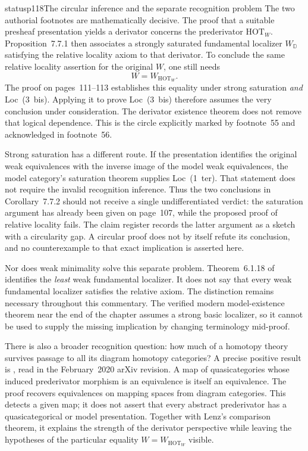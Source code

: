 \begin{dcomment}{status}{p118}{The circular inference and the separate recognition problem}
The two authorial footnotes are mathematically decisive. The proof that a suitable presheaf presentation yields a derivator concerns the prederivator $\mathrm{HOT}_W$. Proposition~7.7.1 then associates a strongly saturated fundamental localizer $W_{\mathbb D}$ satisfying the relative locality axiom to that derivator. To conclude the same relative locality assertion for the original $W$, one still needs
\[
 W=W_{\mathrm{HOT}_W}.
\]
The proof on pages~111--113 establishes this equality under strong saturation \emph{and} Loc~(3~bis). Applying it to prove Loc~(3~bis) therefore assumes the very conclusion under consideration. The derivator existence theorem does not remove that logical dependence. This is the circle explicitly marked by footnote~55 and acknowledged in footnote~56.

Strong saturation has a different route. If the presentation identifies the original weak equivalences with the inverse image of the model weak equivalences, the model category's saturation theorem supplies Loc~(1~ter). That statement does not require the invalid recognition inference. Thus the two conclusions in Corollary~7.7.2 should not receive a single undifferentiated verdict: the saturation argument has already been given on page~107, while the proposed proof of relative locality fails. The claim register records the latter argument as a sketch with a circularity gap. A circular proof does not by itself refute its conclusion, and no counterexample to that exact implication is asserted here.

Nor does weak minimality solve this separate problem. Theorem~6.1.18 of \citet{Cisinski2006} identifies the \emph{least} weak fundamental localizer. It does not say that every weak fundamental localizer satisfies the relative axiom. The distinction remains necessary throughout this commentary. The verified modern model-existence theorem near the end of the chapter assumes a strong basic localizer, so it cannot be used to supply the missing implication by changing terminology mid-proof.

There is also a broader recognition question: how much of a homotopy theory survives passage to all its diagram homotopy categories? A precise positive result is \citet[Theorem~37]{Arlin2020}, read in the February~2020 arXiv revision. A map of quasicategories whose induced prederivator morphism is an equivalence is itself an equivalence. The proof recovers equivalences on mapping spaces from diagram categories. This detects a given map; it does not assert that every abstract prederivator has a quasicategorical or model presentation. Together with Lenz's comparison theorem, it explains the strength of the derivator perspective while leaving the hypotheses of the particular equality $W=W_{\mathrm{HOT}_W}$ visible.
\end{dcomment}

